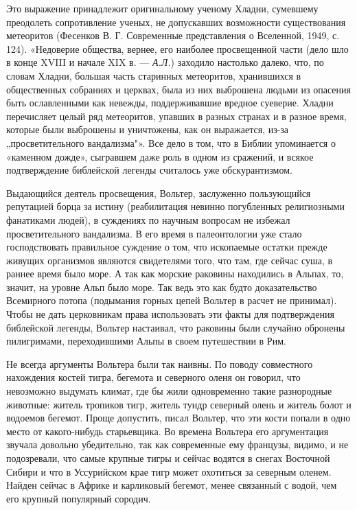 Это  выражение  принадлежит  оригинальному ученому  Хладни,  сумевшему
преодолеть   сопротивление   ученых,    не   допускавших   возможности
существования метеоритов  (Фесенков В. Г. Современные  представления о
Вселенной, 1949,  с. 124).  «Недоверие общества, вернее,  его наиболее
просвещенной  части (дело  шло  в  конце XVIII  и  начале  XIX в.  ---
\emph{А.Л.}) заходило настолько далеко, что, по словам Хладни, большая
часть  старинных метеоритов,  хранившихся в  общественных собраниях  и
церквах, была  из них выброшена  людьми из опасения  быть ославленными
как  невежды,  поддерживавшие  вредное  суеверие.  Хладни  перечисляет
целый  ряд метеоритов,  упавших в  разных  странах и  в разное  время,
которые  были  выброшены  и   уничтожены,  как  он  выражается,  из-за
„просветительного  вандализма"».   Все  дело  в  том,   что  в  Библии
упоминается  о  «каменном  дожде»,  сыгравшем даже  роль  в  одном  из
сражений,  и всякое  подтверждение  библейской  легенды считалось  уже
обскурантизмом.

Выдающийся  деятель  просвещения,   Вольтер,  заслуженно  пользующийся
репутацией   борца  за   истину   (реабилитация  невинно   погубленных
религиозными  фанатиками людей),  в суждениях  по научным  вопросам не
избежал просветительного  вандализма. В его время  в палеонтологии уже
стало господствовать правильное суждение о том, что ископаемые остатки
прежде  живущих организмов  являются  свидетелями того,  что там,  где
сейчас суша,  в раннее  время было  море. А  так как  морские раковины
находились в  Альпах, то, значит, на  уровне Альп было море.  Так ведь
это  как  будто  доказательство Всемирного  потопа  (подымания  горных
цепей  Вольтер  в  расчет  не принимал).  Чтобы  не  дать  церковникам
права  использовать эти  факты для  подтверждения библейской  легенды,
Вольтер настаивал,  что раковины  были случайно  обронены пилигримами,
переходившими Альпы в своем путешествии в Рим.

Не всегда  аргументы Вольтера были  так наивны. По  поводу совместного
нахождения костей  тигра, бегемота и  северного оленя он  говорил, что
невозможно выдумать климат, где бы жили одновременно такие разнородные
животные: житель тропиков  тигр, житель тундр северный  олень и житель
болот  и водоемов  бегемот. Проще  допустить, писал  Вольтер, что  эти
кости попали  в одно  место от  какого-нибудь старьевщика.  Во времена
Вольтера  его  аргументация  звучала  довольно  убедительно,  так  как
современные ему французы, видимо, и  не подозревали, что самые крупные
тигры и сейчас  водятся в снегах Восточной Сибири и  что в Уссурийском
крае тигр может  охотиться за северным оленем. Найден  сейчас в Африке
и  карликовый  бегемот,  менее  связанный с  водой,  чем  его  крупный
популярный сородич.

